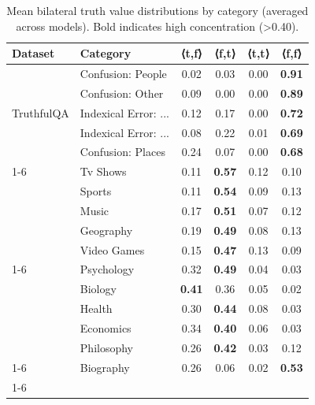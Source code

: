 \begin{table}[htbp]
\centering
\caption{Mean bilateral truth value distributions by category (averaged across models). Bold indicates high concentration (>0.40).}
\small
\begin{tabular}{ll|cccc}
\toprule
\textbf{Dataset} & \textbf{Category} & ⟨t,f⟩ & ⟨f,t⟩ & ⟨t,t⟩ & ⟨f,f⟩ \\
\midrule
\multirow{5}{*}{TruthfulQA} & Confusion: People & 0.02 & 0.03 & 0.00 & \textbf{0.91} \\
 & Confusion: Other & 0.09 & 0.00 & 0.00 & \textbf{0.89} \\
 & Indexical Error: ... & 0.12 & 0.17 & 0.00 & \textbf{0.72} \\
 & Indexical Error: ... & 0.08 & 0.22 & 0.01 & \textbf{0.69} \\
 & Confusion: Places & 0.24 & 0.07 & 0.00 & \textbf{0.68} \\
\cline{1-6}
\multirow{5}{*}{SimpleQA} & Tv Shows & 0.11 & \textbf{0.57} & 0.12 & 0.10 \\
 & Sports & 0.11 & \textbf{0.54} & 0.09 & 0.13 \\
 & Music & 0.17 & \textbf{0.51} & 0.07 & 0.12 \\
 & Geography & 0.19 & \textbf{0.49} & 0.08 & 0.13 \\
 & Video Games & 0.15 & \textbf{0.47} & 0.13 & 0.09 \\
\cline{1-6}
\multirow{5}{*}{MMLU-Pro} & Psychology & 0.32 & \textbf{0.49} & 0.04 & 0.03 \\
 & Biology & \textbf{0.41} & 0.36 & 0.05 & 0.02 \\
 & Health & 0.30 & \textbf{0.44} & 0.08 & 0.03 \\
 & Economics & 0.34 & \textbf{0.40} & 0.06 & 0.03 \\
 & Philosophy & 0.26 & \textbf{0.42} & 0.03 & 0.12 \\
\cline{1-6}
\multirow{1}{*}{FACTScore} & Biography & 0.26 & 0.06 & 0.02 & \textbf{0.53} \\
\cline{1-6}
\bottomrule
\end{tabular}
\end{table}

